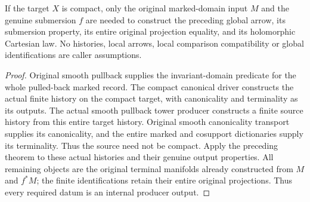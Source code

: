 \begin{theorem}
\label{hir:original-compact-global-terminal-smooth-map-cartesian}
\leanok
{}
If the target $X$ is compact, only the original marked-domain input $M$ and
the genuine submersion $f$ are needed to construct the preceding global
arrow, its submersion property, its entire original projection equality,
and its holomorphic Cartesian law. No histories, local arrows, local
comparison compatibility or global identifications are caller assumptions.
\end{theorem}
\begin{proof}
Original smooth pullback supplies the invariant-domain predicate for the
whole pulled-back marked record. The compact canonical driver constructs
the actual finite history on the compact target, with canonicality
and terminality as its outputs. The actual smooth pullback tower producer
constructs a finite source history from this entire target history. Original
smooth canonicality transport supplies its canonicality, and the entire
marked and cosupport dictionaries supply its terminality. Thus the source
need not be compact. Apply the preceding theorem to these actual histories
and their genuine output properties. All remaining
objects are the original terminal manifolds already constructed from
$M$ and $f^*M$; the finite identifications retain their entire original
projections. Thus every required datum is an internal producer output.
\end{proof}
